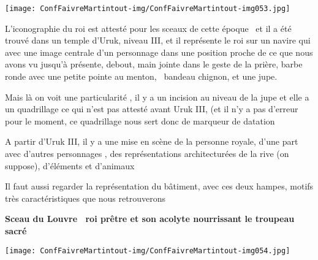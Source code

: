 \documentclass[a4paper]{article}
\begin{document}
\bigskip


\texttt{[image: ConfFaivreMartintout-img/ConfFaivreMartintout-img053.jpg]}



\bigskip


\bigskip


\bigskip


\bigskip


\bigskip


\bigskip


\bigskip

{
L'iconographie du roi est attesté pour les sceaux de cette époque \ et
il a été trouvé dans un temple d'Uruk, niveau III, et il représente le
roi sur un navire qui avec une image centrale d'un personnage dans une
position proche de ce que nous avons vu jusqu'à présente, debout, main
jointe dans le geste de la prière, barbe ronde avec une petite pointe
au menton, \ bandeau chignon, et une jupe.}

{
Mais là on voit une particularité , il y a un incision au niveau de la
jupe et elle a un quadrillage ce qui n'est pas attesté avant Uruk III,
(et il n'y a pas d'erreur pour le moment, ce quadrillage nous sert donc
de marqueur de datation}


\bigskip


\bigskip

{
A partir d'Uruk III, il y a une mise en scène de la personne royale,
d'une part avec d'autres personnages , des représentations
architecturées de la rive (on suppose), d'éléments et d'animaux}


\bigskip


\bigskip

{
Il faut aussi regarder la représentation du bâtiment, avec ces deux
hampes, motifs très caractéristiques que nous retrouverons}


\bigskip


\bigskip


\bigskip


\bigskip

{
\textbf{Sceau du Louvre \ roi prêtre et son acolyte nourrissant le
troupeau sacré}}


\bigskip


\bigskip


\texttt{[image: ConfFaivreMartintout-img/ConfFaivreMartintout-img054.jpg]}
\end{document}
